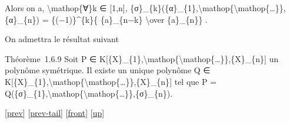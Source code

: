 \documentclass[]{article}
\begin{document}
Alors on a, \textbackslash{}mathop\{∀\}k ∈ {[}1,n{]},
\{σ\}\_\{k\}(\{α\}\_\{1\},\textbackslash{}mathop\{\textbackslash{}mathop\{\ldots{}\}\},\{α\}\_\{n\})
= \{(−1)\}\^{}\{k\}\{ \{a\}\_\{n−k\} \textbackslash{}over \{a\}\_\{n\}\}
.

On admettra le résultat suivant

Théorème~1.6.9 Soit P ∈
K{[}\{X\}\_\{1\},\textbackslash{}mathop\{\textbackslash{}mathop\{\ldots{}\}\},\{X\}\_\{n\}{]}
un polynôme symétrique. Il existe un unique polynôme Q ∈
K{[}\{X\}\_\{1\},\textbackslash{}mathop\{\textbackslash{}mathop\{\ldots{}\}\},\{X\}\_\{n\}{]}
tel que P =
Q(\{σ\}\_\{1\},\textbackslash{}mathop\{\textbackslash{}mathop\{\ldots{}\}\},\{σ\}\_\{n\}).

{[}\href{coursse5.html}{prev}{]}
{[}\href{coursse5.html\#tailcoursse5.html}{prev-tail}{]}
{[}\href{coursse6.html}{front}{]}
{[}\href{coursch2.html\#coursse6.html}{up}{]}
\end{document}
